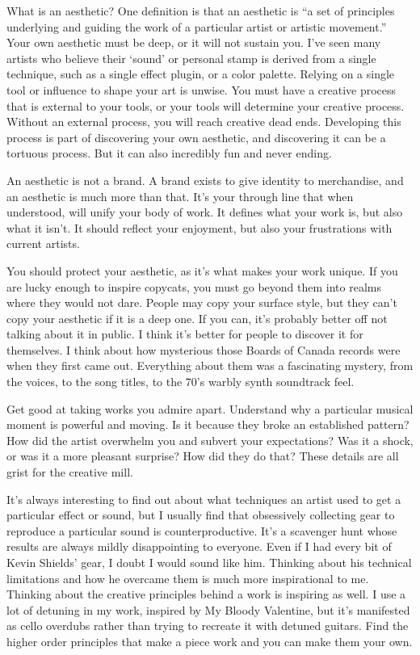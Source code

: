\documentclass[
]{book}
\begin{document}
What is an aesthetic? One definition is that an aesthetic is ``a set of principles underlying and guiding the work of a particular artist or artistic movement.'' Your own aesthetic must be deep, or it will not sustain you. I've seen many artists who believe their `sound' or personal stamp is derived from a single technique, such as a single effect plugin, or a color palette. Relying on a single tool or influence to shape your art is unwise. You must have a creative process that is external to your tools, or your tools will determine your creative process. Without an external process, you will reach creative dead ends. Developing this process is part of discovering your own aesthetic, and discovering it can be a tortuous process. But it can also incredibly fun and never ending.

An aesthetic is not a brand. A brand exists to give identity to merchandise, and an aesthetic is much more than that. It's your through line that when understood, will unify your body of work. It defines what your work is, but also what it isn't. It should reflect your enjoyment, but also your frustrations with current artists.

You should protect your aesthetic, as it's what makes your work unique. If you are lucky enough to inspire copycats, you must go beyond them into realms where they would not dare. People may copy your surface style, but they can't copy your aesthetic if it is a deep one. If you can, it's probably better off not talking about it in public. I think it's better for people to discover it for themselves. I think about how mysterious those Boards of Canada records were when they first came out. Everything about them was a fascinating mystery, from the voices, to the song titles, to the 70's warbly synth soundtrack feel.

Get good at taking works you admire apart. Understand why a particular musical moment is powerful and moving. Is it because they broke an established pattern? How did the artist overwhelm you and subvert your expectations? Was it a shock, or was it a more pleasant surprise? How did they do that? These details are all grist for the creative mill.

It's always interesting to find out about what techniques an artist used to get a particular effect or sound, but I usually find that obsessively collecting gear to reproduce a particular sound is counterproductive. It's a scavenger hunt whose results are always mildly disappointing to everyone. Even if I had every bit of Kevin Shields' gear, I doubt I would sound like him. Thinking about his technical limitations and how he overcame them is much more inspirational to me. Thinking about the creative principles behind a work is inspiring as well. I use a lot of detuning in my work, inspired by My Bloody Valentine, but it's manifested as cello overdubs rather than trying to recreate it with detuned guitars. Find the higher order principles that make a piece work and you can make them your own.
\end{document}
